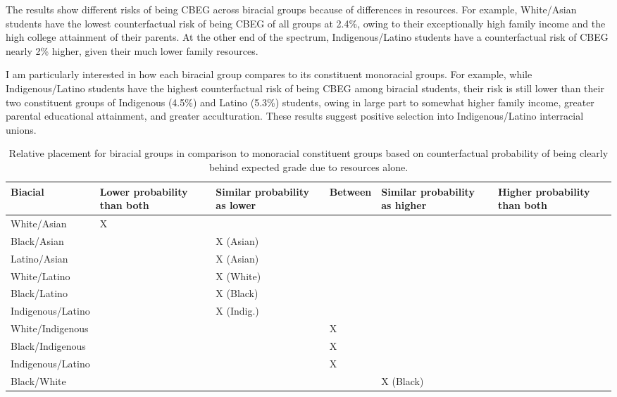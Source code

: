 \documentclass[
  letterpaper,
  DIV=11,
  numbers=noendperiod]{scrartcl}
\begin{document}
The results show different risks of being CBEG across biracial groups
because of differences in resources. For example, White/Asian students
have the lowest counterfactual risk of being CBEG of all groups at
2.4\%, owing to their exceptionally high family income and the high
college attainment of their parents. At the other end of the spectrum,
Indigenous/Latino students have a counterfactual risk of CBEG nearly 2\%
higher, given their much lower family resources.

I am particularly interested in how each biracial group compares to its
constituent monoracial groups. For example, while Indigenous/Latino
students have the highest counterfactual risk of being CBEG among
biracial students, their risk is still lower than their two constituent
groups of Indigenous (4.5\%) and Latino (5.3\%) students, owing in large
part to somewhat higher family income, greater parental educational
attainment, and greater acculturation. These results suggest positive
selection into Indigenous/Latino interracial unions.

\hypertarget{tbl-resource-summary}{}
\begin{table}
\caption{\label{tbl-resource-summary}Relative placement for biracial groups in comparison to monoracial
constituent groups based on counterfactual probability of being clearly
behind expected grade due to resources alone. }\tabularnewline

\centering
\begin{tabular}[t]{>{\raggedright\arraybackslash}p{2cm}>{\raggedleft\arraybackslash}p{2cm}>{\raggedleft\arraybackslash}p{2cm}>{\raggedleft\arraybackslash}p{2cm}>{\raggedleft\arraybackslash}p{2cm}>{\raggedleft\arraybackslash}p{2cm}}
\toprule
Biacial & Lower probability than both & Similar probability as lower & Between & Similar probability as higher & Higher probability than both\\
\midrule
White/Asian & X &  &  &  & \\
Black/Asian &  & X (Asian) &  &  & \\
Latino/Asian &  & X (Asian) &  &  & \\
White/Latino &  & X (White) &  &  & \\
Black/Latino &  & X (Black) &  &  & \\
Indigenous/Latino &  & X (Indig.) &  &  & \\
White/Indigenous &  &  & X &  & \\
Black/Indigenous &  &  & X &  & \\
Indigenous/Latino &  &  & X &  & \\
Black/White &  &  &  & X (Black) & \\
\bottomrule
\end{tabular}
\end{table}
\end{document}
